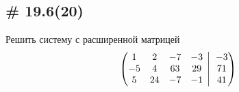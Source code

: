 \documentclass[a4paper,12pt]{article}
\newcommand{\BigMiddleThree}{\;\left|\vphantom{\begin{pmatrix} 0\\0\\0 \end{pmatrix}}\right.\;}
\begin{document}
  
  \subsection{\# 19.6(20)}
  
  Решить систему с расширенной матрицей
  \[
    \left(
      \begin{matrix}
        1 & 2 & -7 & -3\\
        -5 & 4 & 63 & 29\\
        5 & 24 & -7 & -1
      \end{matrix}
      \BigMiddleThree
      \begin{matrix}
        -3\\
        71\\
        41
      \end{matrix}
    \right)
  \]
  
\end{document}
